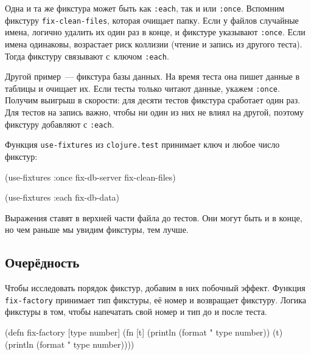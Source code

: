 
Одна и та же фикстура может быть как \verb|:each|, так и или
\verb|:once|. Вспомним фикстуру \verb|fix-clean-files|, которая очищает
папку. Если у файлов случайные имена, логично удалить их один раз в конце, и
фикстуре указывают \verb|:once|. Если имена одинаковы, возрастает риск коллизии
(чтение и запись из другого теста). Тогда фикстуру связывают с~ключом
\verb|:each|.

Другой пример~--- фикстура базы данных. На время теста она пишет данные в
таблицы и очищает их. Если тесты только читают данные, укажем
\verb|:once|. Получим выигрыш в скорости: для десяти тестов фикстура сработает
один раз. Для тестов на запись важно, чтобы ни один из них не влиял на другой,
поэтому фикстуру добавляют с \verb|:each|.

Функция \verb|use-fixtures| из \verb|clojure.test| принимает ключ и любое
число фикстур:


\begin{english}
  \begin{clojure}
(use-fixtures :once
  fix-db-server fix-clean-files)

(use-fixtures :each fix-db-data)
  \end{clojure}
\end{english}

Выражения ставят в верхней части файла до тестов. Они могут быть и в конце, но
чем раньше мы увидим фикстуры, тем лучше.

\subsection{Очерёдность}

Чтобы исследовать порядок фикстур, добавим в них побочный эффект. Функция
\verb|fix-factory| принимает тип фикстуры, её номер и возвращает
фикстуру. Логика фикстуры в том, чтобы напечатать свой номер и тип до и после
теста.


\ifnarrow

\begin{english}
  \begin{clojure}
(defn fix-factory [type number]
  (fn [t]
    (println (format "%
               type number))
    (t)
    (println (format "%
               type number))))
  \end{clojure}
\end{english}


